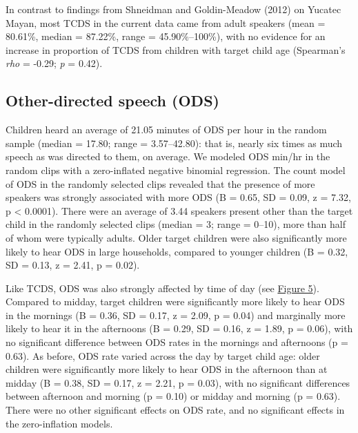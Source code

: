 \documentclass[floatsintext,man]{apa6}
\theoremstyle{definition}
\theoremstyle{definition}
\theoremstyle{definition}
\theoremstyle{remark}
\begin{document}
In contrast to findings from Shneidman and Goldin-Meadow (2012) on
Yucatec Mayan, most TCDS in the current data came from adult speakers
(mean = 80.61\%, median = 87.22\%, range = 45.90\%--100\%), with no
evidence for an increase in proportion of TCDS from children with target
child age (Spearman's \emph{rho} = -0.29; \emph{p} = 0.42).

\subsection{Other-directed speech
(ODS)}\label{other-directed-speech-ods}

Children heard an average of 21.05 minutes of ODS per hour in the random
sample (median = 17.80; range = 3.57--42.80): that is, nearly six times
as much speech as was directed to them, on average. We modeled ODS
min/hr in the random clips with a zero-inflated negative binomial
regression. The count model of ODS in the randomly selected clips
revealed that the presence of more speakers was strongly associated with
more ODS (B = 0.65, SD = 0.09, z = 7.32, p \textless{} 0.0001). There
were an average of 3.44 speakers present other than the target child in
the randomly selected clips (median = 3; range = 0--10), more than half
of whom were typically adults. Older target children were also
significantly more likely to hear ODS in large households, compared to
younger children (B = 0.32, SD = 0.13, z = 2.41, p = 0.02).

Like TCDS, ODS was also strongly affected by time of day (see
\protect\hyperlink{fig5}{Figure 5}). Compared to midday, target children
were significantly more likely to hear ODS in the mornings (B = 0.36, SD
= 0.17, z = 2.09, p = 0.04) and marginally more likely to hear it in the
afternoons (B = 0.29, SD = 0.16, z = 1.89, p = 0.06), with no
significant difference between ODS rates in the mornings and afternoons
(p = 0.63). As before, ODS rate varied across the day by target child
age: older children were significantly more likely to hear ODS in the
afternoon than at midday (B = 0.38, SD = 0.17, z = 2.21, p = 0.03), with
no significant differences between afternoon and morning (p = 0.10) or
midday and morning (p = 0.63). There were no other significant effects
on ODS rate, and no significant effects in the zero-inflation models.
\end{document}
